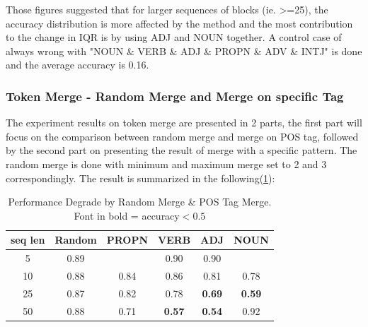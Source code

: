 \documentclass[12pt]{article}
\begin{document}
Those figures suggested that for larger sequences of blocks (ie. >=25), the accuracy distribution is more affected by the method and the most contribution to the change in IQR is by using ADJ and NOUN together.
A control case of always wrong with "NOUN \& VERB \& ADJ \& PROPN \& ADV \& INTJ" is done and the average accuracy is 0.16. 

\subsubsection{Token Merge - Random Merge and Merge on specific Tag }
The experiment results on token merge are presented in 2 parts, the first part will focus on the comparison between random merge and merge on POS tag, followed by the second part on presenting the result of merge with a specific pattern. The random merge is done with minimum and maximum merge set to 2 and 3 correspondingly. The result is summarized in the following(\ref{tab:mergeDegrade}):


\begin{table}[!h]
\begin{center}
\fontsize{10pt}{10pt}\selectfont
\begin{tabular}{|c|c|c|c|c|c|}
\hline
seq len & Random & PROPN & VERB                                                         & ADJ                                                          & NOUN                                                         \\ \hline
5       & 0.89   &       & 0.90                                                         & 0.90                                                         &                                                              \\ \hline
10      & 0.88   & 0.84  & 0.86                                                         & 0.81                                                         & 0.78                                                         \\ \hline
25      & 0.87   & 0.82  & 0.78                                                         &\textbf{0.69} & \textbf{0.59} \\ \hline
50      & 0.88   & 0.71  & \textbf{0.57} &  \textbf{0.54} & 0.92                                                         \\ \hline
\end{tabular}
\caption{Performance Degrade by Random Merge \& POS Tag Merge.\\ Font in bold = accuracy$<0.5$}
\label{tab:mergeDegrade}
\end{center}
\end{table}
\end{document}
